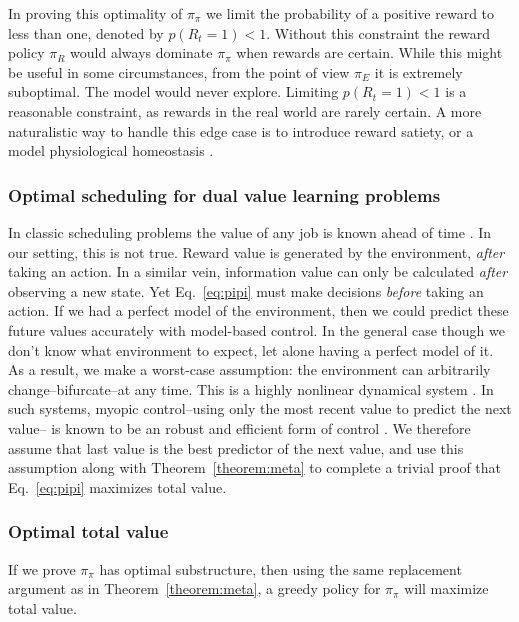 In proving this optimality of $\pi_{\pi}$ we limit the probability of a positive reward to less than one, denoted by $p(R_t = 1) < 1$. Without this constraint the reward policy $\pi_R$ would always dominate $\pi_{\pi}$ when rewards are certain. While this might be useful in some circumstances, from the point of view $\pi_E$ it is extremely suboptimal. The model would never explore. Limiting $p(R_t = 1) < 1$ is a reasonable constraint, as rewards in the real world are rarely certain. A more naturalistic way to handle this edge case is to introduce reward satiety, or a model physiological homeostasis \citep{Keramati2014,Juechems2019}.

\subsubsection*{Optimal scheduling for dual value learning problems}
In classic scheduling problems the value of any job is known ahead of time \citep{Bellmann1954,Roughgarden2019}. In our setting, this is not true. Reward value is generated by the environment, \textit{after} taking an action. In a similar vein, information value can only be calculated \textit{after} observing a new state. Yet Eq.~\ref{eq:pipi} must make decisions \textit{before} taking an action. If we had a perfect model of the environment, then we could predict these future values accurately with model-based control. In the general case though we don't know what environment to expect, let alone having a perfect model of it. As a result, we make a worst-case assumption: the environment can arbitrarily change--bifurcate--at any time. This is a highly nonlinear dynamical system \citep{Strogatz1994}. In such systems, myopic control--using only the most recent value to predict the next value-- is known to be an robust and efficient form of control \citep{Hocker2019}. We therefore assume that last value is the best predictor of the next value, and use this assumption along with Theorem~\ref{theorem:meta} to complete a trivial proof that Eq.~\ref{eq:pipi} maximizes total value.

\subsubsection*{Optimal total value}
If we prove $\pi_{\pi}$ has optimal substructure, then using the same replacement argument \citep{Roughgarden2019} as in Theorem~\ref{theorem:meta}, a greedy policy for $\pi_\pi$ will maximize total value.

